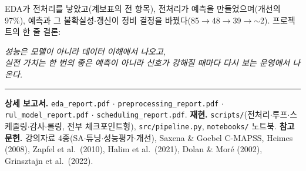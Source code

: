 \documentclass[11pt]{article}
\begin{document}
EDA가 전처리를 낳았고(계보표의 전 항목), 전처리가 예측을 만들었으며(개선의 97\%),
예측과 그 불확실성$\cdot$갱신이 정비 결정을 바꿨다(85$\to$48$\to$39$\to$$\sim$2).
프로젝트의 한 줄 결론:

\begin{center}
\emph{성능은 모델이 아니라 데이터 이해에서 나오고,\\
실전 가치는 한 번의 좋은 예측이 아니라 신호가 강해질 때마다 다시 보는 운영에서 나온다.}
\end{center}

\vspace{1em}
\hrule
\vspace{0.6em}
\small
\textbf{상세 보고서.} \texttt{eda\_report.pdf} $\cdot$ \texttt{preprocessing\_report.pdf} $\cdot$
\texttt{rul\_model\_report.pdf} $\cdot$ \texttt{scheduling\_report.pdf}.
\textbf{재현.} \texttt{scripts/}(전처리$\cdot$루프$\cdot$스케줄링$\cdot$감사$\cdot$롤링, 전부 체크포인트형),
\texttt{src/pipeline.py}, \texttt{notebooks/} 노트북.
\textbf{참고문헌.} 강의자료 4종(SA$\cdot$튜닝$\cdot$성능평가$\cdot$개선), Saxena \& Goebel C-MAPSS,
Heimes (2008), Zapfel et al.\ (2010), Halim et al.\ (2021), Dolan \& Mor\'e (2002), Grinsztajn et al.\ (2022).
\end{document}
